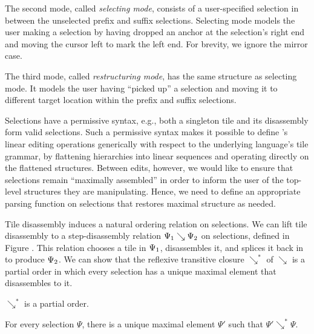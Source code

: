 The second mode, called \emph{selecting mode},
consists of a user-specified selection in between
the unselected prefix and suffix selections.
Selecting mode models the user making a selection by
having dropped
an anchor at the selection's right end and moving
the cursor left to mark the left end.
For brevity, we ignore the mirror case.

The third mode, called \emph{restructuring mode},
has the same structure as selecting mode.
It models the user having ``picked up'' a selection
and moving it to different target location within the
prefix and suffix selections.


Selections have a permissive syntax, e.g., both
a singleton tile and its disassembly form valid selections.
Such a permissive syntax makes it possible to define
\ty's linear editing operations generically with
respect to the underlying language's tile grammar,
by flattening hierarchies into linear sequences and
operating directly on the flattened structures.
Between edits, however, we would like to ensure
that selections remain ``maximally assembled'' in order
to inform the user of the top-level structures they
are manipulating.
Hence, we need to define an appropriate parsing function
on selections that restores maximal structure as needed.

Tile disassembly induces a natural ordering relation
on selections.
We can lift tile disassembly to a step-disassembly relation
$\Psi_1 \searrow \Psi_2$
on selections, defined
in Figure .
This relation chooses a tile in $\Psi_1$, disassembles
it, and splices it back in to produce $\Psi_2$.
We can show that the reflexive transitive closure
$\searrow^*$ of $\searrow$ is a partial order in
which every selection has a unique maximal element
that disassembles to it.

\begin{lemma}
  $\searrow^*$ is a partial order.
\end{lemma}

\begin{lemma}\label{lemma:unique-parsed-selection}
  For every selection $\Psi$, there is a unique maximal
  element $\Psi'$ such that $\Psi'\searrow^*\Psi$.
\end{lemma}

